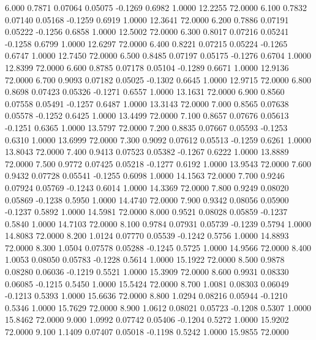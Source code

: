    6.000   0.7871   0.07064   0.05075  -0.1269   0.6982   1.0000  12.2255  72.0000
   6.100   0.7832   0.07140   0.05168  -0.1259   0.6919   1.0000  12.3641  72.0000
   6.200   0.7886   0.07191   0.05222  -0.1256   0.6858   1.0000  12.5002  72.0000
   6.300   0.8017   0.07216   0.05241  -0.1258   0.6799   1.0000  12.6297  72.0000
   6.400   0.8221   0.07215   0.05224  -0.1265   0.6747   1.0000  12.7450  72.0000
   6.500   0.8485   0.07197   0.05175  -0.1276   0.6704   1.0000  12.8399  72.0000
   6.600   0.8785   0.07178   0.05104  -0.1289   0.6671   1.0000  12.9136  72.0000
   6.700   0.9093   0.07182   0.05025  -0.1302   0.6645   1.0000  12.9715  72.0000
   6.800   0.8698   0.07423   0.05326  -0.1271   0.6557   1.0000  13.1631  72.0000
   6.900   0.8560   0.07558   0.05491  -0.1257   0.6487   1.0000  13.3143  72.0000
   7.000   0.8565   0.07638   0.05578  -0.1252   0.6425   1.0000  13.4499  72.0000
   7.100   0.8657   0.07676   0.05613  -0.1251   0.6365   1.0000  13.5797  72.0000
   7.200   0.8835   0.07667   0.05593  -0.1253   0.6310   1.0000  13.6999  72.0000
   7.300   0.9092   0.07612   0.05513  -0.1259   0.6261   1.0000  13.8043  72.0000
   7.400   0.9413   0.07523   0.05382  -0.1267   0.6222   1.0000  13.8889  72.0000
   7.500   0.9772   0.07425   0.05218  -0.1277   0.6192   1.0000  13.9543  72.0000
   7.600   0.9432   0.07728   0.05541  -0.1255   0.6098   1.0000  14.1563  72.0000
   7.700   0.9246   0.07924   0.05769  -0.1243   0.6014   1.0000  14.3369  72.0000
   7.800   0.9249   0.08020   0.05869  -0.1238   0.5950   1.0000  14.4740  72.0000
   7.900   0.9342   0.08056   0.05900  -0.1237   0.5892   1.0000  14.5981  72.0000
   8.000   0.9521   0.08028   0.05859  -0.1237   0.5840   1.0000  14.7103  72.0000
   8.100   0.9784   0.07931   0.05739  -0.1239   0.5794   1.0000  14.8083  72.0000
   8.200   1.0124   0.07770   0.05539  -0.1242   0.5756   1.0000  14.8893  72.0000
   8.300   1.0504   0.07578   0.05288  -0.1245   0.5725   1.0000  14.9566  72.0000
   8.400   1.0053   0.08050   0.05783  -0.1228   0.5614   1.0000  15.1922  72.0000
   8.500   0.9878   0.08280   0.06036  -0.1219   0.5521   1.0000  15.3909  72.0000
   8.600   0.9931   0.08330   0.06085  -0.1215   0.5450   1.0000  15.5424  72.0000
   8.700   1.0081   0.08303   0.06049  -0.1213   0.5393   1.0000  15.6636  72.0000
   8.800   1.0294   0.08216   0.05944  -0.1210   0.5346   1.0000  15.7629  72.0000
   8.900   1.0612   0.08021   0.05723  -0.1208   0.5307   1.0000  15.8462  72.0000
   9.000   1.0992   0.07742   0.05406  -0.1204   0.5272   1.0000  15.9202  72.0000
   9.100   1.1409   0.07407   0.05018  -0.1198   0.5242   1.0000  15.9855  72.0000
